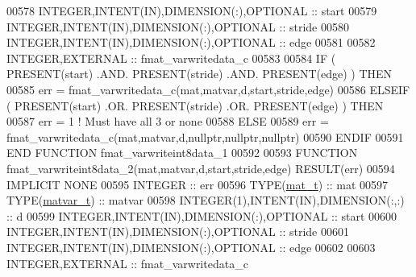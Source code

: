 \begin{DoxyCode}
00578     \textcolor{keywordtype}{INTEGER},\textcolor{keywordtype}{INTENT(IN)},\textcolor{keywordtype}{DIMENSION(:)},\textcolor{keywordtype}{OPTIONAL} :: start
00579     \textcolor{keywordtype}{INTEGER},\textcolor{keywordtype}{INTENT(IN)},\textcolor{keywordtype}{DIMENSION(:)},\textcolor{keywordtype}{OPTIONAL} :: stride
00580     \textcolor{keywordtype}{INTEGER},\textcolor{keywordtype}{INTENT(IN)},\textcolor{keywordtype}{DIMENSION(:)},\textcolor{keywordtype}{OPTIONAL} :: edge
00581 
00582     \textcolor{keywordtype}{INTEGER},\textcolor{keywordtype}{EXTERNAL}                         :: fmat\_varwritedata\_c
00583 
00584     \textcolor{keywordflow}{IF} ( \textcolor{keyword}{PRESENT}(start) .AND. \textcolor{keyword}{PRESENT}(stride) .AND. \textcolor{keyword}{PRESENT}(edge) ) \textcolor{keywordflow}{THEN}
00585         err = fmat\_varwritedata\_c(mat,matvar,d,start,stride,edge)
00586     \textcolor{keywordflow}{ELSEIF} ( \textcolor{keyword}{PRESENT}(start) .OR. \textcolor{keyword}{PRESENT}(stride) .OR. \textcolor{keyword}{PRESENT}(edge) ) \textcolor{keywordflow}{THEN}
00587         err = 1    \textcolor{comment}{! Must have all 3 or none}
00588     \textcolor{keywordflow}{ELSE}
00589         err = fmat\_varwritedata\_c(mat,matvar,d,nullptr,nullptr,nullptr)
00590 \textcolor{keywordflow}{    ENDIF}
00591 \textcolor{keyword}{END FUNCTION }fmat\_varwriteint8data\_1
00592 
00593 \textcolor{keyword}{FUNCTION }fmat\_varwriteint8data\_2(mat,matvar,d,start,stride,edge) \textcolor{keyword}{RESULT}(err)
00594 \textcolor{keywordtype}{IMPLICIT NONE}
00595     \textcolor{keywordtype}{INTEGER}                                  :: err
00596     \textcolor{keywordtype}{TYPE}(\hyperlink{group___m_a_t_gab0fc888f5a5d79943b16284b1f91c2e8}{mat\_t})                              :: mat
00597     \textcolor{keywordtype}{TYPE}(\hyperlink{group___m_a_t_structmatvar__t}{matvar\_t})                           :: matvar
00598     \textcolor{keywordtype}{INTEGER(1)},\textcolor{keywordtype}{INTENT(IN)},\textcolor{keywordtype}{DIMENSION(:,:)}     :: d
00599     \textcolor{keywordtype}{INTEGER},\textcolor{keywordtype}{INTENT(IN)},\textcolor{keywordtype}{DIMENSION(:)},\textcolor{keywordtype}{OPTIONAL} :: start
00600     \textcolor{keywordtype}{INTEGER},\textcolor{keywordtype}{INTENT(IN)},\textcolor{keywordtype}{DIMENSION(:)},\textcolor{keywordtype}{OPTIONAL} :: stride
00601     \textcolor{keywordtype}{INTEGER},\textcolor{keywordtype}{INTENT(IN)},\textcolor{keywordtype}{DIMENSION(:)},\textcolor{keywordtype}{OPTIONAL} :: edge
00602 
00603     \textcolor{keywordtype}{INTEGER},\textcolor{keywordtype}{EXTERNAL}                         :: fmat\_varwritedata\_c

\end{DoxyCode}
